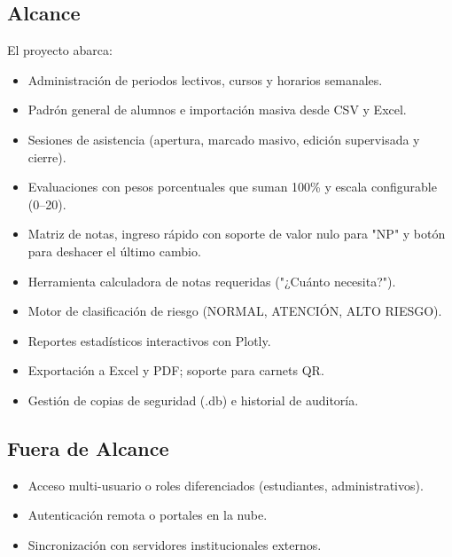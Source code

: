 \documentclass[12pt,a4paper]{article}
\begin{document}
\subsection{Alcance}
El proyecto abarca:
\begin{itemize}
    \item Administración de periodos lectivos, cursos y horarios semanales.
    \item Padrón general de alumnos e importación masiva desde CSV y Excel.
    \item Sesiones de asistencia (apertura, marcado masivo, edición supervisada y cierre).
    \item Evaluaciones con pesos porcentuales que suman 100\% y escala configurable (0–20).
    \item Matriz de notas, ingreso rápido con soporte de valor nulo para "NP" y botón para deshacer el último cambio.
    \item Herramienta calculadora de notas requeridas ("¿Cuánto necesita?").
    \item Motor de clasificación de riesgo (NORMAL, ATENCIÓN, ALTO RIESGO).
    \item Reportes estadísticos interactivos con Plotly.
    \item Exportación a Excel y PDF; soporte para carnets QR.
    \item Gestión de copias de seguridad (.db) e historial de auditoría.
\end{itemize}

\subsection{Fuera de Alcance}
\begin{itemize}
    \item Acceso multi-usuario o roles diferenciados (estudiantes, administrativos).
    \item Autenticación remota o portales en la nube.
    \item Sincronización con servidores institucionales externos.
\end{itemize}
\end{document}
